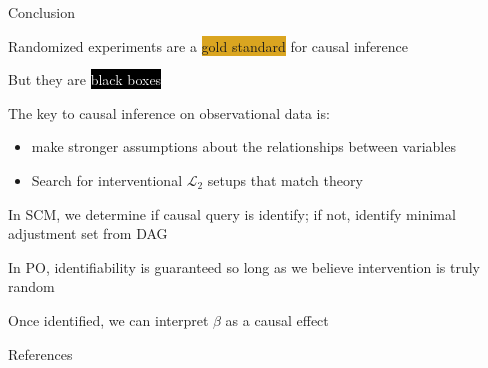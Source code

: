 \documentclass[notes,11pt, aspectratio=169, usenames, dvipsnames]{beamer}
\newenvironment{wideitemize}{\itemize\addtolength{\itemsep}{10pt}}{\enditemize}
\begin{document}
\begin{frame}{Conclusion}
	\begin{wideitemize}
		\item Randomized experiments are a \colorbox{Goldenrod}{gold standard} for causal inference
		\item But they are \colorbox{Black}{\textcolor{White}{black boxes}}
		
		\item The key to causal inference on observational data is:
		\begin{itemize}
			\item make stronger assumptions about the relationships between variables 
			\item Search for interventional $\mathcal{L}_2$ setups that match theory 
		\end{itemize}
		\item In SCM, we determine if causal query is identify; if not, identify minimal adjustment set from DAG
		\item In PO, identifiability is guaranteed so long as we believe intervention is truly random
		\item Once identified, we can interpret $\beta$ as a causal effect 
	\end{wideitemize}

\end{frame}
\begin{frame}[allowframebreaks]{References}
	\printbibliography
\end{frame}



\end{document}

